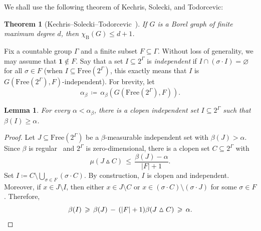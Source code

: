 \documentclass[10pt]{amsart}
\newtheorem{theo}[cdrthm]{Theorem}
\newtheorem{lemm}[cdrthm]{Lemma}
\theoremstyle{definition}
\newcommand{\0}{\varnothing}
\renewcommand{\leq}{\leqslant}
\renewcommand{\geq}{\geqslant}
\newcommand{\defeq}{\coloneqq}
\newcommand{\symdif}{\vartriangle}
\newcommand{\Free}{\mathrm{Free}}
\newcommand{\rmB}{\mathrm{B}}
\newcommand{\bfun}{\mathbf{1}}
\begin{document}
We shall use the following theorem of Kechris, Solecki, and Todorcevic:

\begin{theo}[{Kechris--Solecki--Todorcevic~\cite[Proposition~4.6]{KST}}]\label{theo:KST}
If $G$ is a Borel graph of finite maximum degree $d$, then $\chi_\rmB(G) \leq d+1$.
\end{theo}

Fix a countable group $\Gamma$ and a finite subset $F \subseteq \Gamma$. Without loss of generality, we may assume that $\bfun \not \in F$. Say that a set $I \subseteq 2^\Gamma$ is \emph{independent} if $I \cap (\sigma \cdot I) = \0$ for all $\sigma \in F$ (when $I \subseteq \Free(2^\Gamma)$, this exactly means that $I$ is $G(\Free(2^\Gamma), F)$-independent). For brevity, let
\[
\alpha_\beta \,
\defeq\, \alpha_\beta\left(G\left(\Free\left(2^\Gamma\right), F\right)\right).
\]

\begin{lemm}\label{lemma:clopen}
For every $\alpha < \alpha_\beta$, there is a clopen independent set $I \subseteq 2^\Gamma$ such that $\beta(I) \geq \alpha$.
\end{lemm}


\begin{proof}
Let $J \subseteq \Free(2^\Gamma)$ be a $\beta$-measurable independent set with $\beta(J) > \alpha$. Since $\beta$ is regular~\cite[Theorem~17.10]{KechrisDST} and $2^\Gamma$ is zero-dimensional, there is a clopen set $C \subseteq 2^\Gamma$ with
\[
\mu(J \symdif C) \,\leq\, \frac{\beta(J) - \alpha}{|F| + 1}.
\]
Set $I
\defeq C \setminus \bigcup_{\sigma \in F} (\sigma \cdot C)$. By construction, $I$ is clopen and independent. Moreover, if $x \in J \setminus I$, then either $x \in J \setminus C$ or $x \in (\sigma \cdot C) \setminus (\sigma \cdot J)$ for some $\sigma \in F$. Therefore,
\[
\beta(I) \,\geq\, \beta(J) \,-\, (|F|+1) \beta(J \symdif C) \,\geq\, \alpha. \qedhere
\]
\end{proof}
\end{document}
